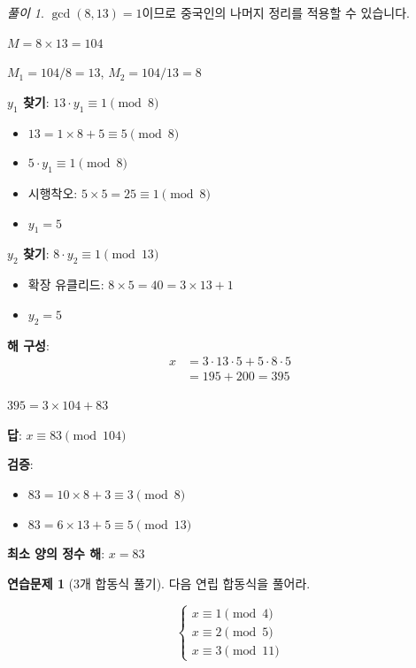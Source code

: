 \documentclass[11pt,a4paper]{article}
\theoremstyle{definition}
\newtheorem{exercise}{연습문제}[section]
\theoremstyle{remark}
\newtheorem*{solution}{풀이}
\begin{document}
\begin{solution}

$\gcd(8, 13) = 1$이므로 중국인의 나머지 정리를 적용할 수 있습니다.

$M = 8 \times 13 = 104$

$M_1 = 104/8 = 13$, $M_2 = 104/13 = 8$

\textbf{$y_1$ 찾기}: $13 \cdot y_1 \equiv 1 \pmod{8}$
\begin{itemize}
    \item $13 = 1 \times 8 + 5 \equiv 5 \pmod{8}$
    \item $5 \cdot y_1 \equiv 1 \pmod{8}$
    \item 시행착오: $5 \times 5 = 25 \equiv 1 \pmod{8}$
    \item $y_1 = 5$
\end{itemize}

\textbf{$y_2$ 찾기}: $8 \cdot y_2 \equiv 1 \pmod{13}$
\begin{itemize}
    \item 확장 유클리드: $8 \times 5 = 40 = 3 \times 13 + 1$
    \item $y_2 = 5$
\end{itemize}

\textbf{해 구성}:
\begin{align*}
x &= 3 \cdot 13 \cdot 5 + 5 \cdot 8 \cdot 5 \\
  &= 195 + 200 = 395
\end{align*}

$395 = 3 \times 104 + 83$

\textbf{답}: $x \equiv 83 \pmod{104}$

\textbf{검증}:
\begin{itemize}
    \item $83 = 10 \times 8 + 3 \equiv 3 \pmod{8}$ \checkmark
    \item $83 = 6 \times 13 + 5 \equiv 5 \pmod{13}$ \checkmark
\end{itemize}

\textbf{최소 양의 정수 해}: $x = 83$
\end{solution}

\begin{exercise}[3개 합동식 풀기]
다음 연립 합동식을 풀어라.

\[\begin{cases}
x \equiv 1 \pmod{4} \\
x \equiv 2 \pmod{5} \\
x \equiv 3 \pmod{11}
\end{cases}\]
\end{exercise}
\end{document}
